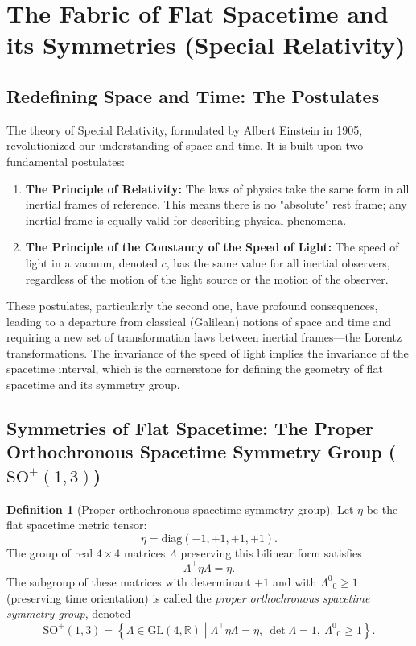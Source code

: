 \documentclass{amsart}
\theoremstyle{definition}
\newtheorem{definition}{Definition}[theorem]
\theoremstyle{remark}
\begin{document}
\section{The Fabric of Flat Spacetime and its Symmetries (Special Relativity)}
\label{sec:sr}

\subsection{Redefining Space and Time: The Postulates}
\label{subsec:sr_postulates}
The theory of Special Relativity, formulated by Albert Einstein in 1905, revolutionized our understanding of space and time. It is built upon two fundamental postulates:

\begin{enumerate}
    \item \textbf{The Principle of Relativity:} The laws of physics take the same form in all inertial frames of reference. This means there is no "absolute" rest frame; any inertial frame is equally valid for describing physical phenomena.
    \item \textbf{The Principle of the Constancy of the Speed of Light:} The speed of light in a vacuum, denoted $c$, has the same value for all inertial observers, regardless of the motion of the light source or the motion of the observer.
\end{enumerate}
These postulates, particularly the second one, have profound consequences, leading to a departure from classical (Galilean) notions of space and time and requiring a new set of transformation laws between inertial frames—the Lorentz transformations. The invariance of the speed of light implies the invariance of the spacetime interval, which is the cornerstone for defining the geometry of flat spacetime and its symmetry group.

\subsection{Symmetries of Flat Spacetime: The Proper Orthochronous Spacetime Symmetry Group ($\mathrm{SO}^+(1,3)$)}
\label{subsec:so13_group}
\begin{definition}[Proper orthochronous spacetime symmetry group]
  Let $\eta$ be the flat spacetime metric tensor:
  \[
  \eta = \mathrm{diag}(-1, +1, +1, +1).
  \]
  The group of real $4 \times 4$ matrices $\Lambda$ preserving this bilinear form satisfies
  \[
  \Lambda^\top \eta \Lambda = \eta.
  \]
  The subgroup of these matrices with determinant $+1$ and with $\Lambda^0{}_0 \geq 1$ (preserving time orientation) is called the \emph{proper orthochronous spacetime symmetry group}, denoted
  \[
  \mathrm{SO}^+(1,3) = \left\{ \Lambda \in \mathrm{GL}(4,\mathbb{R}) \middle|
  \Lambda^\top \eta \Lambda = \eta,\ \det \Lambda = 1,\ \Lambda^0{}_0 \geq 1 \right\}.
  \]
\end{definition}
\end{document}
